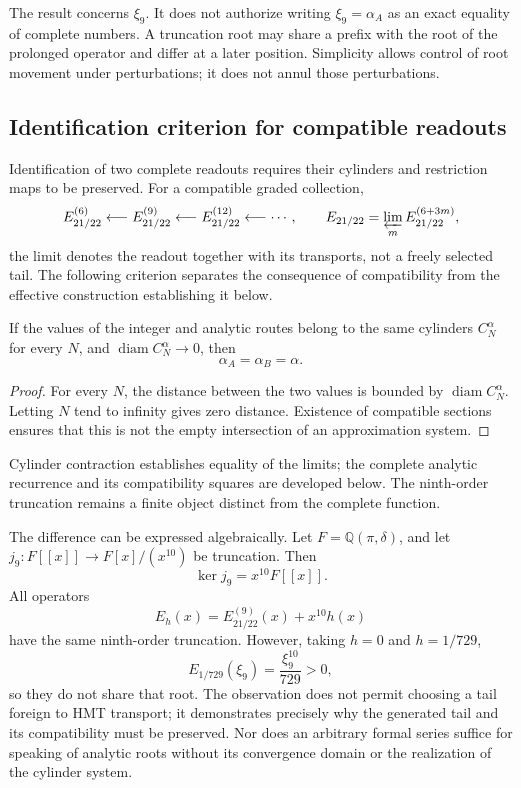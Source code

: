 The result concerns \(\xi_9\). It does not authorize writing
\(\xi_9=\alpha_A\) as an exact equality of complete numbers.
A truncation root may share a prefix with the root of the
prolonged operator and differ at a later position. Simplicity
allows control of root movement under perturbations; it does not
annul those perturbations.

\subsection{Identification criterion for compatible readouts}
\label{subsec:alpha-limite-dos-vias}

Identification of two complete readouts requires their cylinders and
restriction maps to be preserved. For a compatible graded collection,
\[
 E_{21/22}^{(6)}\longleftarrow E_{21/22}^{(9)}
 \longleftarrow E_{21/22}^{(12)}\longleftarrow\cdots,
 \qquad
 E_{21/22}=\varprojlim_m E_{21/22}^{(6+3m)},
\]
the limit denotes the readout together with its transports, not a freely
selected tail. The following criterion separates the consequence of
compatibility from the effective construction establishing it below.

\begin{proposition}
\label{prop:alpha-dos-limites}
If the values of the integer and analytic routes belong to the
same cylinders \(C_N^\alpha\) for every \(N\), and
\(\operatorname{diam}C_N^\alpha\to0\), then
\[
 \alpha_A=\alpha_B=\alpha.
\]
\end{proposition}

\begin{proof}
For every \(N\), the distance between the two values is bounded
by \(\operatorname{diam}C_N^\alpha\). Letting \(N\) tend to infinity
gives zero distance. Existence of compatible sections ensures
that this is not the empty intersection of an approximation system.
\end{proof}

Cylinder contraction establishes equality of the limits; the complete
analytic recurrence and its compatibility squares are developed below.
The ninth-order truncation remains a finite object distinct from the
complete function.

The difference can be expressed algebraically. Let
\(F=\mathbb Q(\pi,\delta)\), and let
\(j_9:F[[x]]\to F[x]/(x^{10})\) be truncation. Then
\[
 \ker j_9=x^{10}F[[x]].
\]
All operators
\[
 E_h(x)=E_{21/22}^{(9)}(x)+x^{10}h(x)
\]
have the same ninth-order truncation. However, taking
\(h=0\) and \(h=1/729\),
\[
 E_{1/729}(\xi_9)=\frac{\xi_9^{10}}{729}>0,
\]
so they do not share that root. The observation does not permit choosing a
tail foreign to HMT transport; it demonstrates precisely why the generated
tail and its compatibility must be preserved. Nor does an arbitrary formal
series suffice for speaking of analytic roots without its convergence
domain or the realization of the cylinder system.


